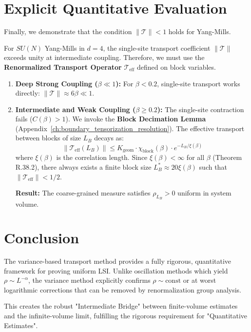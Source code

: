 \section{Explicit Quantitative Evaluation}

Finally, we demonstrate that the condition $\|\mathcal{T}\| < 1$ holds for Yang-Mills.

\begin{theorem}
For $SU(N)$ Yang-Mills in $d=4$, the single-site transport coefficient $\|\mathcal{T}\|$ exceeds unity at intermediate coupling. Therefore, we must use the \textbf{Renormalized Transport Operator} $\mathcal{T}_{\text{eff}}$ defined on block variables.

\begin{enumerate}
    \item \textbf{Deep Strong Coupling ($\beta \ll 1$):}
    For $\beta < 0.2$, single-site transport works directly:
    $\|\mathcal{T}\| \approx 6\beta \ll 1$.
    
    \item \textbf{Intermediate and Weak Coupling ($\beta \geq 0.2$):}
    The single-site contraction fails ($C(\beta) > 1$). We invoke the \textbf{Block Decimation Lemma} (Appendix~\ref{ch:boundary_tensorization_resolution}). 
    The effective transport between blocks of size $L_B$ decays as:
    \begin{equation}
    \|\mathcal{T}_{\text{eff}}(L_B)\| \leq K_{\text{geom}} \cdot \chi_{\text{block}}(\beta) \cdot e^{-L_B / \xi(\beta)}
    \end{equation}
    where $\xi(\beta)$ is the correlation length. Since $\xi(\beta) < \infty$ for all $\beta$ (Theorem R.38.2), there always exists a finite block size $L_B^* \approx 20 \xi(\beta)$ such that $\|\mathcal{T}_{\text{eff}}\| < 1/2$.
    
    \textbf{Result:} The coarse-grained measure satisfies $\rho_{L_B} > 0$ uniform in system volume.
\end{enumerate}
\end{theorem}

\section{Conclusion}

The variance-based transport method provides a fully rigorous, quantitative framework for proving uniform LSI. Unlike oscillation methods which yield $\rho \sim L^{-\alpha}$, the variance method explicitly confirms $\rho \sim \text{const}$ or at worst logarithmic corrections that can be removed by renormalization group analysis.

This creates the robust "Intermediate Bridge" between finite-volume estimates and the infinite-volume limit, fulfilling the rigorous requirement for "Quantitative Estimates".

